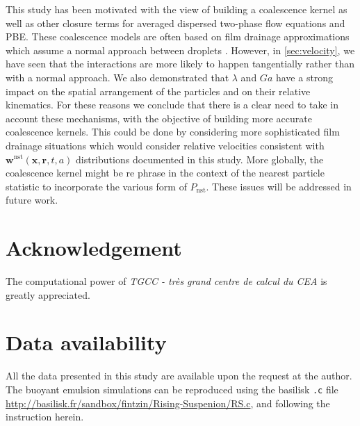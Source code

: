 This study has been motivated with the view of building a coalescence kernel as well as other closure terms for averaged dispersed two-phase flow equations and PBE. 
These coalescence models are often based on film drainage approximations which assume a normal approach between droplets \citet{chesters1991modelling}.  
However, in \ref{sec:velocity}, we have seen that the interactions are more likely to happen tangentially rather than with a normal approach. 
We also demonstrated that $\lambda$ and $Ga$ have a strong impact on the spatial arrangement of the particles and on their relative kinematics. 
For these reasons we conclude that there is a clear need to take in account these mechanisms, with the objective of building more accurate coalescence kernels. 
This could be done by considering more sophisticated film drainage situations which would consider relative velocities consistent with $\textbf{w}^\text{nst}(\textbf{x},\textbf{r},t,a)$ distributions documented in this study.
More globally, the coalescence kernel might be re phrase in the context of the nearest particle statistic to incorporate the various form of $P_\text{nst}$. 
These issues will be addressed in future work.  



\section*{Acknowledgement}

The computational power of  \textit{TGCC - tr\`es grand centre de calcul du CEA} is greatly appreciated. 
\section*{Data availability}

All the data presented in this study are available upon the request at the author. 
The buoyant emulsion simulations can be reproduced using the basilisk \texttt{.c} file \url{http://basilisk.fr/sandbox/fintzin/Rising-Suspenion/RS.c}, and following the instruction herein. 